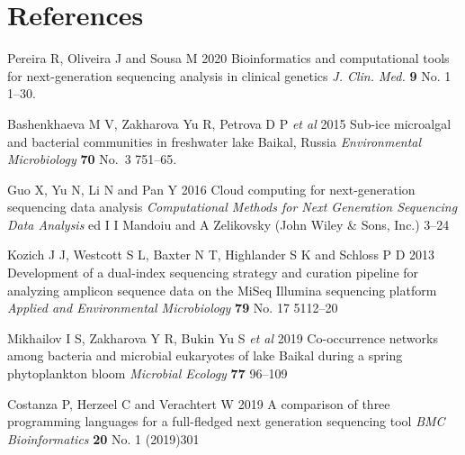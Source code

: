\documentclass[a4paper]{jpconf}
\renewcommand{\doi}[1]{} %
\begin{document}

\section*{References}

\begin{thebibliography}{0}

 Pereira R, Oliveira J and Sousa M 2020 Bioinformatics and computational tools for next-generation sequencing analysis in clinical genetics \emph{J. Clin. Med.} \textbf{9}  No. 1 1--30. \doi{10.3390/jcm9010132}

 Bashenkhaeva M V, Zakharova Yu R, Petrova D P \emph{et al} 2015 Sub-ice microalgal and bacterial communities in freshwater lake Baikal, Russia \emph{Environmental Microbiology} \textbf{70} No.~3 751--65. \doi{10.1007/s00248-015-0619-2}

 Guo X, Yu N, Li N and Pan Y 2016 Cloud computing for next-generation sequencing data analysis \emph{Computational Methods for Next Generation Sequencing Data Analysis} ed I I Mandoiu and  A Zelikovsky (John Wiley \& Sons, Inc.) 3--24

 Kozich J J, Westcott S L, Baxter N T, Highlander S K and Schloss P D 2013 Development of a dual-index sequencing strategy and curation pipeline for analyzing amplicon sequence data on the MiSeq Illumina sequencing platform \emph{Applied and Environmental Microbiology} \textbf{79} No. 17 5112--20 \doi{10.1128/AEM.01043-13}

 Mikhailov I S, Zakharova Y R, Bukin Yu S \emph{et al} 2019 Co-occurrence networks among bacteria and microbial eukaryotes of lake Baikal during a spring phytoplankton bloom \emph{Microbial Ecology} \textbf{77} 96--109 \doi{10.1007/s00248-018-1212-2} %


 Costanza P, Herzeel C and Verachtert W 2019 A comparison of three
 programming languages for a full-fledged next generation sequencing tool \emph{BMC Bioinformatics} \textbf{20} No. 1 (2019)301 \doi{10.1186/s12859-019-2903-5}


\end{thebibliography}
\end{document}
